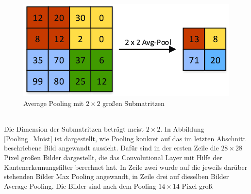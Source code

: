 \documentclass[11pt]{article}
\begin{document}
\begin{figure}[h]
	\centering
	\includegraphics[width=0.7\linewidth]{../graphics/Average-Pooling-Example.png}
	\caption[Average Pooling mit $2\times2$ großen Submatritzen\newline
	Aus: Dominguez-Morales, Juan Pedro. (2018). Neuromorphic audio processing through real-time embedded spiking neural networks. Abbildung 33]{Average Pooling mit $2\times2$ großen Submatritzen}
	\label{AvgPool}
\end{figure}
\\
Die Dimension der Submatritzen beträgt meist $2\times2$. In Abbildung \ref{Pooling_Mnist} ist dargestellt, wie Pooling konkret auf das im letzten Abschnitt beschriebene Bild angewandt aussieht. Dafür sind in der ersten Zeile die $28\times28$ Pixel großen Bilder dargestellt, die das Convolutional Layer mit Hilfe der Kantenerkennungsfilter berechnet hat. In Zeile zwei wurde auf die jeweils darüber stehenden Bilder Max Pooling angewandt, in Zeile drei auf dieselben Bilder Average Pooling. Die Bilder sind nach dem Pooling $14\times14$ Pixel groß.
\end{document}
